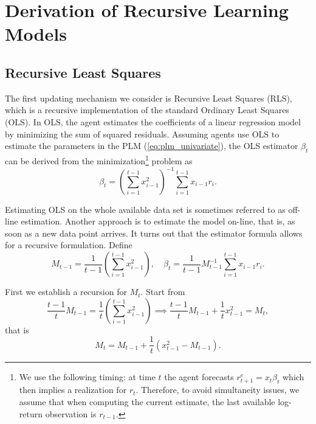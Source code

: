\documentclass[11pt]{article}
\begin{document}


\appendix

\section{Derivation of Recursive Learning Models}\label{sec:appendix_learning}
\subsection{Recursive Least Squares}\label{app:RLS}

The first updating mechanism we consider is Recursive Least Squares (RLS), which is a recursive implementation of the standard Ordinary Least Squares (OLS).
In OLS, the agent estimates the coefficients of a linear regression model by minimizing the sum of squared residuals.
Assuming agents use OLS to estimate the parameters in the PLM (\ref{eq:plm_univariate}), the OLS estimator $\beta_t$ can be derived from the minimization\footnote{
We use the following timing:
at time $t$ the agent forecasts $r^e_{t+1} = x_t \beta_{t}$ which then implies a realization for $r_t$. 
Therefore, to avoid simultaneity issues, we assume that when computing the current estimate, the last available log-return observation is $r_{t-1}$.
} problem as
\begin{equation}
     \beta_t = \left(\sum^{t-1}_{i=1}  x_{i-1}^2 \right)^{-1} \sum^{t-1}_{i=1}  x_{i-1} r_i.
\end{equation}

Estimating OLS on the whole available data set is sometimes referred to as off-line estimation. 
Another approach is to estimate the model on-line, that is, as soon as a new data point arrives. 
It turns out that the estimator formula allows for a recursive formulation.
Define 
\begin{equation}
M_{t-1} = \frac{1}{t-1}  \left(\sum^{t-1}_{i=1}  x_{i-1}^2 \right), \quad \beta_t = \frac{1}{t-1} M^{-1}_{t-1} \sum^{t-1}_{i=1}  x_{i-1} r_i.
\end{equation}

First we establish a recursion for $M_t$. Start from 
\begin{equation}
\frac{t-1}{t} M_{t-1} = \frac{1}{t}  \left(\sum^{t-1}_{i=1}  x_{i-1}^2 \right) \implies \frac{t-1}{t} M_{t-1} + \frac{1}{t} x_{t-1}^2 = M_t,
\end{equation}
that is
\begin{equation}
    M_t = M_{t-1} + \frac{1}{t} \left(x_{t-1}^2 - M_{t-1} \right).
\end{equation}
\end{document}
